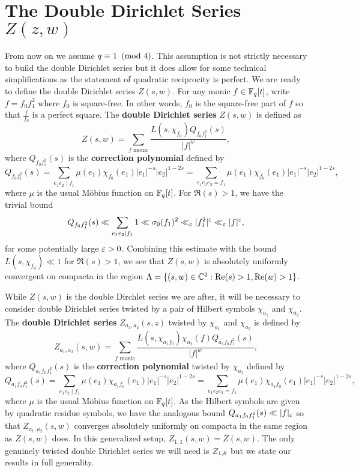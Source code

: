 \documentclass[12pt,reqno,oneside]{amsart}
\begin{document}
\section{The Double Dirichlet Series \texorpdfstring{$Z(z,w)$}{Z(s,w)}}
    From now on we assume $q \equiv 1 \ \left(\text{mod }4\right)$. This assumption is not strictly necessary to build the double Dirichlet series but it does allow for some technical simplifications as the statement of quadratic reciprocity is perfect. We are ready to define the double Dirichlet series $Z(s,w)$. For any monic $f \in \mathbb{F}_{q}[t]$, write $f = f_{0}f_{1}^{2}$ where $f_{0}$ is square-free. In other words, $f_{0}$ is the square-free part of $f$ so that $\frac{f}{f_{0}}$ is a perfect square. The \textbf{double Dirichlet series} $Z(s,w)$ is defined as
    \[
        Z(s,w) = \sum_{\text{$f$ monic}}\frac{L(s,\chi_{f_{0}})Q_{f_{0}f_{1}^{2}}(s)}{|f|^{w}},
    \]
    where $Q_{f_{0}f_{1}^{2}}(s)$ is the \textbf{correction polynomial} defined by
    \[
        Q_{f_{0}f_{1}^{2}}(s) = \sum_{e_{1}e_{2} \mid f_{1}}\mu(e_{1})\chi_{f_{0}}(e_{1})|e_{1}|^{-s}|e_{2}|^{1-2s} = \sum_{e_{1}e_{2}e_{3} = f_{1}}\mu(e_{1})\chi_{f_{0}}(e_{1})|e_{1}|^{-s}|e_{2}|^{1-2s},
    \]
    where $\mu$ is the usual M\"obius function on $\mathbb{F}_{q}[t]$. For $\Re(s) > 1$, we have the trivial bound
    \[
        Q_{f_{0}f_{1}^{2}}(s) \ll \sum_{e_{1}e_{2} \mid f_{1}}1 \ll \sigma_{0}(f_{1})^{2} \ll_{\varepsilon} |f_{1}^{2}|^{\varepsilon} \ll_{\varepsilon} |f|^{\varepsilon},
    \]
    for some potentially large $\varepsilon > 0$. Combining this estimate with the bound $L(s,\chi_{f_{0}}) \ll 1$ for $\Re(s) > 1$, we see that $Z(s,w)$ is absolutely uniformly convergent on compacta in the region $\Lambda = \{(s,w) \in \mathbb{C}^{2}:\mathrm{Re}(s) > 1, \mathrm{Re}(w) > 1\}$.

    While $Z(s,w)$ is the double Dirchlet series we are after, it will be necessary to consider double Dirichlet series twisted by a pair of Hilbert symbols $\chi_{a_{1}}$ and $\chi_{a_{2}}$. The \textbf{double Dirichlet series} $Z_{a_{1},a_{2}}(s,z)$ twisted by $\chi_{a_{1}}$ and $\chi_{a_{2}}$ is defined by
    \[
        Z_{a_{1},a_{2}}(s,w) = \sum_{\text{$f$ monic}}\frac{L(s,\chi_{a_{1}f_{0}})\chi_{a_{2}}(f)Q_{a_{1}f_{0}f_{1}^{2}}(s)}{|f|^{w}},
    \]
    where $Q_{a_{1}f_{0}f_{1}^{2}}(s)$ is the \textbf{correction polynomial} twisted by $\chi_{a_{1}}$ defined by
    \[
        Q_{a_{1}f_{0}f_{1}^{2}}(s) = \sum_{e_{1}e_{2} \mid f_{1}}\mu(e_{1})\chi_{a_{1}f_{0}}(e_{1})|e_{1}|^{-s}|e_{2}|^{1-2s} = \sum_{e_{1}e_{2}e_{3} = f_{1}}\mu(e_{1})\chi_{a_{1}f_{0}}(e_{1})|e_{1}|^{-s}|e_{2}|^{1-2s},
    \]
    where $\mu$ is the usual M\"obius function on $\mathbb{F}_{q}[t]$. As the Hilbert symbols are given by quadratic residue symbols, we have the analogous bound $Q_{a_{1}f_{0}f_{1}^{2}}(s) \ll |f|_{\varepsilon}$ so that $Z_{a_{1},a_{2}}(s,w)$ converges absolutely uniformly on compacta in the same region as $Z(s,w)$ does. In this generalized setup, $Z_{1,1}(s,w) = Z(s,w)$. The only genuinely twisted double Dirichlet series we will need is $Z_{1,\theta}$ but we state our results in full generality.
\end{document}
